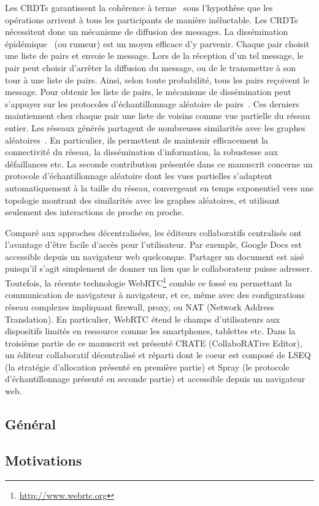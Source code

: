 Les CRDTs garantissent la cohérence à terme~\cite{bailis2013eventual} sous
l'hypothèse que les opérations arrivent à tous les participants de manière
inéluctable. Les CRDTs nécessitent donc un mécanisme de diffusion des
messages. La dissémination épidémique~\cite{demers1987epidemic,
  eugster2003lightweight, birman1999bimodal} (ou rumeur) est un moyen efficace
d'y parvenir. Chaque pair choisit une liste de pairs et envoie le message. Lors
de la réception d'un tel message, le pair peut choisir d'arrêter la diffusion du
message, ou de le transmettre à son tour à une liste de pairs. Ainsi, selon
toute probabilité, tous les pairs reçoivent le message. Pour obtenir les liste
de pairs, le mécanisme de dissémination peut s'appuyer sur les protocoles
d'échantillonnage aléatoire de pairs~\cite{jelasity2007gossip,
  voulgaris2005cyclon, ganesh2001scamp, tolgyeski2009adaptive,
  eugster2003lightweight}. Ces derniers maintiennent chez chaque pair une liste
de voisins comme vue partielle du réseau entier. Les réseaux générés partagent
de nombreuses similarités avec les graphes aléatoires~\cite{erdos1959random}. En
particulier, ils permettent de maintenir efficacement la connectivité du réseau,
la dissémination d'information, la robustesse aux défaillances etc. La seconde
contribution présentée dans ce manuscrit concerne un protocole d'échantillonnage
aléatoire dont les vues partielles s'adaptent automatiquement à la taille du
réseau, convergeant en temps exponentiel vers une topologie montrant des
similarités avec les graphes aléatoires, et utilisant seulement des interactions
de proche en proche.

Comparé aux approches décentralisées, les éditeurs collaboratifs centralisés ont
l'avantage d'être facile d'accès pour l'utilisateur. Par exemple, Google Docs
est accessible depuis un navigateur web quelconque. Partager un document est
aisé puisqu'il s'agit simplement de donner un lien que le collaborateur puisse
adresser. Toutefois, la récente technologie
WebRTC\footnote{\url{http://www.webrtc.org}} comble ce fossé en permettant la
communication de navigateur à navigateur, et ce, même avec des configurations
réseau complexes impliquant firewall, proxy, ou NAT (Network Address
Translation). En particulier, WebRTC étend le champs d'utilisateurs aux
dispositifs limités en ressource comme les smartphones, tablettes etc. Dans la
troisième partie de ce manuscrit est présenté CRATE (CollaboRATive Editor), un
éditeur collaboratif décentralisé et réparti dont le coeur est composé de LSEQ
(la stratégie d'allocation présenté en première partie) et Spray (le protocole
d'échantillonnage présenté en seconde partie) et accessible depuis un navigateur
web.

\subsection{Général}

\subsection{Motivations}
